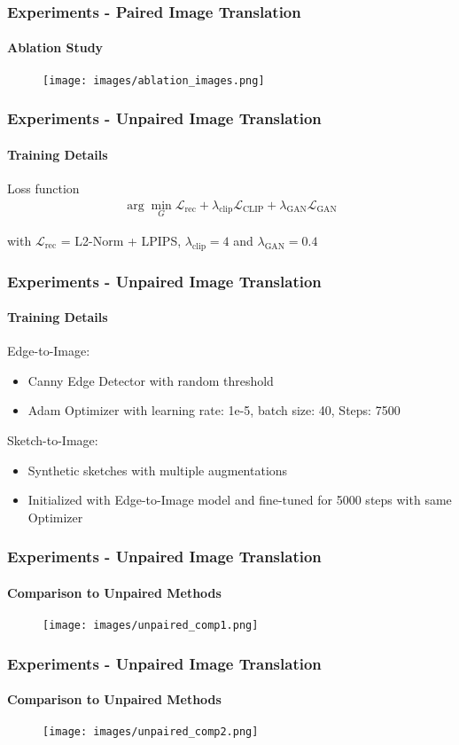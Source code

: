 \begin{frame}
    \frametitle{Experiments - Paired Image Translation}
    \framesubtitle{Ablation Study}
    \begin{figure}
        \centering
        \texttt{[image: images/ablation\_images.png]}
        
    \end{figure}
    \end{frame}
\begin{frame}
\frametitle{Experiments - Unpaired Image Translation}
\framesubtitle{Training Details}
\begin{block}{Loss function}
    \begin{align}
        \arg \underset{G}{\min} \mathcal{L}_{\text{rec}} + \lambda _{\text{clip}} \mathcal{L}_{\text{CLIP}} + \lambda_{\text{GAN}}\mathcal{L}_{\text{GAN}}
    \end{align}
\end{block}
with $\mathcal{L}_{\text{rec}}$ = L2-Norm + LPIPS, $\lambda_{\text{clip}} = 4$ and $\lambda_{\text{GAN}} = 0.4$
\end{frame}

\begin{frame}
    \frametitle{Experiments - Unpaired Image Translation}
    \framesubtitle{Training Details}
        Edge-to-Image:
        \begin{itemize}
            \item Canny Edge Detector with random threshold
            \item Adam Optimizer with learning rate: 1e-5, batch size: 40, Steps: 7500
        \end{itemize}
        Sketch-to-Image:
        \begin{itemize}
            \item Synthetic sketches with multiple augmentations
            \item Initialized with Edge-to-Image model and fine-tuned for 5000 steps with same Optimizer
        \end{itemize}
\end{frame}

\begin{frame}
    \frametitle{Experiments - Unpaired Image Translation}
    \framesubtitle{Comparison to Unpaired Methods}
    \begin{figure}
        \centering
        \texttt{[image: images/unpaired\_comp1.png]}
        
    \end{figure}
\end{frame}

\begin{frame}
    \frametitle{Experiments - Unpaired Image Translation}
    \framesubtitle{Comparison to Unpaired Methods}
    \begin{figure}
        \centering
        \texttt{[image: images/unpaired\_comp2.png]}
            
    \end{figure}
\end{frame}
